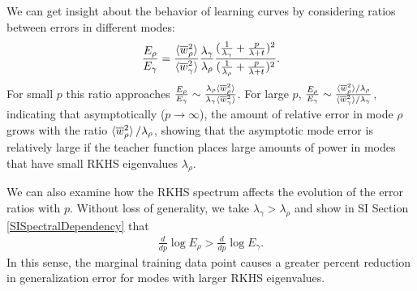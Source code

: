 \documentclass{article}
\begin{document}
We can get insight about the behavior of learning curves by considering ratios between errors in different modes:
%
\begin{equation}
    \frac{E_\rho}{E_\gamma} = \frac{\braket{\overline{w}_\rho^2}}{\braket{\overline{w}_\gamma^2}}\frac{\lambda_\gamma}{\lambda_\rho} \frac{(\frac{1}{\lambda_\gamma} + \frac{p}{\lambda+t})^2}{(\frac{1}{\lambda_\rho} + \frac{p}{\lambda+t})^2}.
\end{equation}
%
For small $p$ this ratio approaches $\frac{E_\rho}{E_\gamma} \sim \frac{\lambda_\rho\braket{\overline{w}_\rho^2}}{\lambda_\gamma\braket{\overline{w}_\gamma^2}}$. For large $p$, $\frac{E_\rho}{E_\gamma} \sim \frac{\braket{\overline{w}_\rho^2}/\lambda_\rho}{\braket{\overline{w}_\gamma^2}/\lambda_\gamma}$, indicating that asymptotically ($p \to \infty$), the amount of relative error in mode $\rho$ grows with the ratio $\braket{\overline{w}_\rho^2 }/\lambda_\rho$, showing that the asymptotic mode error is relatively large if the teacher function places large amounts of power in modes that have small RKHS eigenvalues $\lambda_\rho$. 

We can also examine how the RKHS spectrum affects the evolution of the error ratios with $p$. Without loss of generality, we take $\lambda_\gamma > \lambda_\rho$ and %
show in SI Section \ref{SISpectralDependency} that 
\begin{align}\label{dplog} \frac{d}{dp} \log E_\rho > \frac{d}{dp} \log E_\gamma.
\end{align} 
In this sense, the marginal training data point causes a greater percent reduction in generalization error for modes with larger RKHS eigenvalues. 
\end{document}
